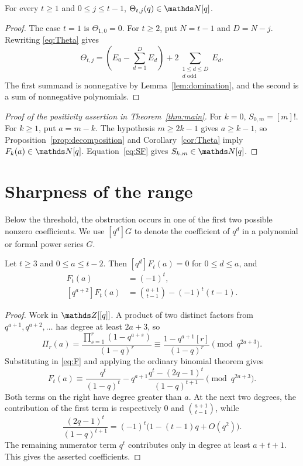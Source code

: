 \documentclass[11pt]{amsart}
\begin{document}
\begin{corollary}\label{cor:Theta}
For every $t\ge1$ and $0\le j\le t-1$, $\Theta_{t,j}(q)\in\N[q]$.
\end{corollary}

\begin{proof}
The case $t=1$ is $\Theta_{1,0}=0$. For $t\ge2$, put $N=t-1$ and
$D=N-j$. Rewriting \eqref{eq:Theta} gives
\[
 \Theta_{t,j}
 =\left(E_0-\sum_{d=1}^{D}E_d\right)
   +2\sum_{\substack{1\le d\le D\\d\text{ odd}}}E_d.
\]
The first summand is nonnegative by Lemma~\ref{lem:domination}, and
the second is a sum of nonnegative polynomials.
\end{proof}

\begin{proof}[Proof of the positivity assertion in Theorem~\ref{thm:main}]
For $k=0$, $S_{0,m}=[m]!$. For $k\ge1$, put $a=m-k$. The hypothesis
$m\ge2k-1$ gives $a\ge k-1$, so Proposition~\ref{prop:decomposition}
and Corollary~\ref{cor:Theta} imply $F_k(a)\in\N[q]$.
Equation~\eqref{eq:SF} gives $S_{k,m}\in\N[q]$.
\end{proof}

\section{Sharpness of the range}\label{sec:sharpness}

Below the threshold, the obstruction occurs in one of the first two
possible nonzero coefficients. We use $[q^d]G$ to denote the coefficient
of $q^d$ in a polynomial or formal power series $G$.

\begin{lemma}\label{lem:low-coefficients}
Let $t\ge3$ and $0\le a\le t-2$. Then $[q^d]F_t(a)=0$ for
$0\le d\le a$, and
\begin{align*}
 [q^{a+1}]F_t(a)&=(-1)^t,\\
 [q^{a+2}]F_t(a)&=\binom{a+1}{t-1}-(-1)^t(t-1).
\end{align*}
\end{lemma}

\begin{proof}
Work in $\Z[[q]]$. A product of two distinct factors from
$q^{a+1},q^{a+2},\ldots$ has degree at least $2a+3$, so
\[
 \Pi_r(a)=\frac{\prod_{s=1}^{r}(1-q^{a+s})}{(1-q)^r}
 \equiv\frac{1-q^{a+1}[r]}{(1-q)^r}\pmod{q^{2a+3}}.
\]
Substituting in \eqref{eq:F} and applying the ordinary binomial theorem
gives
\begin{equation}\label{eq:sharp-series}
 F_t(a)\equiv
 \frac{q^t}{(1-q)^t}
 -q^{a+1}\frac{q^t-(2q-1)^t}{(1-q)^{t+1}}
 \pmod{q^{2a+3}}.
\end{equation}
Both terms on the right have degree greater than $a$. At the next two
degrees, the contribution of the first term is respectively $0$ and
$\binom{a+1}{t-1}$, while
\[
 \frac{(2q-1)^t}{(1-q)^{t+1}}
 =(-1)^t\bigl(1-(t-1)q+O(q^2)\bigr).
\]
The remaining numerator term $q^t$ contributes only in degree at least
$a+t+1$. This gives the asserted coefficients.
\end{proof}
\end{document}
